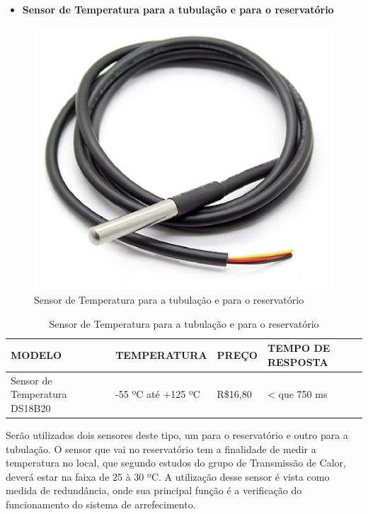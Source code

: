 \begin{itemize}
    \item \textbf{Sensor de Temperatura para a tubulação e para o reservatório}
\end{itemize}
\begin{figure}[!htb]                  
	\centering                          
	\includegraphics[scale=0.5]{figuras/Figura4.eps}
	\caption{ Sensor de Temperatura para a tubulação e para o reservatório } \label{figsensor2}           
\end{figure}

\begin{table}[]
    \centering
    \begin{tabular}{|p{3cm}|p{5cm}|p{3cm}|p{3cm}|}
    \hline
    \textbf{MODELO} & \textbf{TEMPERATURA}    & \textbf{PREÇO} & \textbf{TEMPO DE RESPOSTA} \\ \hline
    Sensor de Temperatura DS18B20      & -55 ºC até +125 ºC &  R\$16,80 & < que 750 ms  \\ \hline
    \end{tabular}
    \caption{Sensor de Temperatura para a tubulação e para o reservatório}
    \end{table}

Serão utilizados dois sensores deste tipo, um para o reservatório e outro para a tubulação. O sensor que vai no reservatório tem a finalidade de medir a temperatura no local, que segundo estudos do grupo de Transmissão de Calor, deverá estar na faixa de 25 à 30 ºC. A utilização desse sensor é vista como medida de redundância, onde sua principal função é a verificação do funcionamento do sistema de arrefecimento. 

